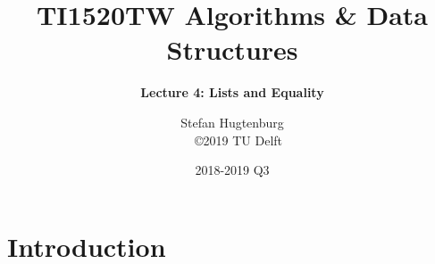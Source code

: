 

\title[Algorithms \& Data Structures]{TI1520TW Algorithms \& Data Structures}
\subtitle{\color{cyan} \textbf{Lecture 4: Lists and Equality}}
\author{Stefan Hugtenburg\\ {\tiny{\qquad~~\copyright 2019 TU Delft}}}
\date{2018-2019 Q3}



\frame{\titlepage}

\section{Introduction}









\frame{\titlepage}


